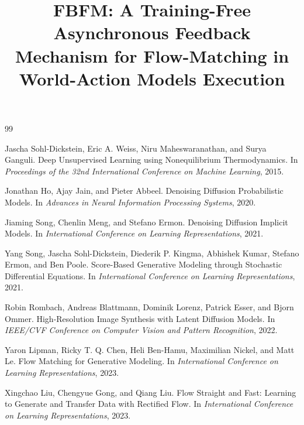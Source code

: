 \documentclass[10pt,twocolumn,letterpaper]{article}
\title{FBFM: A Training-Free Asynchronous Feedback Mechanism for Flow-Matching in
World-Action Models Execution}
\author{}
\date{}
\begin{document}
\makeatletter
\twocolumn[{%
\begin{@twocolumnfalse}
\maketitle

\vspace{1.0em}
\end{@twocolumnfalse}
}]
\makeatother









\clearpage
\begin{thebibliography}{99}

Jascha Sohl-Dickstein, Eric A. Weiss, Niru Maheswaranathan, and Surya
Ganguli.
\newblock Deep Unsupervised Learning using Nonequilibrium Thermodynamics.
\newblock In \emph{Proceedings of the 32nd International Conference on Machine
Learning}, 2015.

Jonathan Ho, Ajay Jain, and Pieter Abbeel.
\newblock Denoising Diffusion Probabilistic Models.
\newblock In \emph{Advances in Neural Information Processing Systems}, 2020.

Jiaming Song, Chenlin Meng, and Stefano Ermon.
\newblock Denoising Diffusion Implicit Models.
\newblock In \emph{International Conference on Learning Representations}, 2021.

Yang Song, Jascha Sohl-Dickstein, Diederik P. Kingma, Abhishek Kumar, Stefano
Ermon, and Ben Poole.
\newblock Score-Based Generative Modeling through Stochastic Differential
Equations.
\newblock In \emph{International Conference on Learning Representations}, 2021.

Robin Rombach, Andreas Blattmann, Dominik Lorenz, Patrick Esser, and Bjorn Ommer.
\newblock High-Resolution Image Synthesis with Latent Diffusion Models.
\newblock In \emph{IEEE/CVF Conference on Computer Vision and Pattern
Recognition}, 2022.

Yaron Lipman, Ricky T. Q. Chen, Heli Ben-Hamu, Maximilian Nickel, and Matt Le.
\newblock Flow Matching for Generative Modeling.
\newblock In \emph{International Conference on Learning Representations}, 2023.

Xingchao Liu, Chengyue Gong, and Qiang Liu.
\newblock Flow Straight and Fast: Learning to Generate and Transfer Data with
Rectified Flow.
\newblock In \emph{International Conference on Learning Representations}, 2023.


\end{thebibliography}
\end{document}
